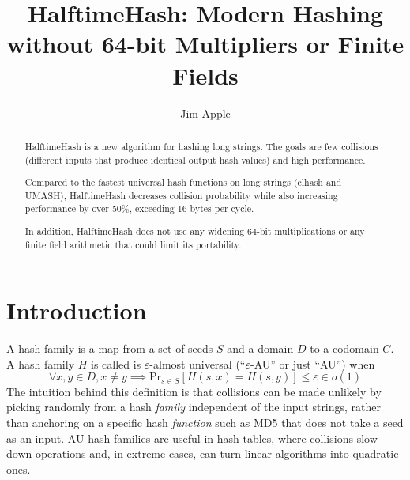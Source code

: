 \documentclass{llncs}
\begin{document}
\title{HalftimeHash: Modern Hashing without 64-bit Multipliers or Finite Fields}
\author{Jim Apple
}
\maketitle

\begin{abstract}
HalftimeHash is a new algorithm for hashing long strings.
The goals are few collisions (different inputs that produce identical output hash values) and high performance.

Compared to the fastest universal hash functions on long strings (clhash and UMASH), HalftimeHash decreases collision probability while also increasing performance by over 50\%, exceeding 16 bytes per cycle.

In addition, HalftimeHash does not use any widening 64-bit multiplications or any finite field arithmetic that could limit its portability.

\end{abstract}

\section{Introduction}
A hash family is a map from a set of seeds $S$ and a domain $D$ to a codomain $C$.
A hash family $H$ is called is $\varepsilon$-almost universal (``$\varepsilon$-AU'' or just ``AU'') when
\[
\forall x,y \in D, x \neq y \implies \mathrm{Pr}_{s \in S}[H(s, x) = H(s, y)] \leq \varepsilon \in o(1)
\]
The intuition behind this definition is that collisions can be made unlikely by picking randomly from a hash {\em family} independent of the input strings, rather than anchoring on a specific hash {\em function} such as MD5 that does not take a seed as an input. AU hash families are useful in hash tables, where collisions slow down operations and, in extreme cases, can turn linear algorithms into quadratic ones. \cite{tabulation,rust-quadratic,impala-quadratic,algorithm-attack}
\end{document}
